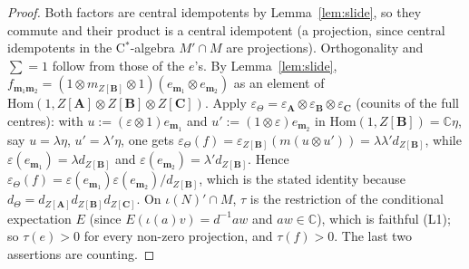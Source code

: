 \documentclass[11pt]{article}
\theoremstyle{definition}
\theoremstyle{remark}
\newcommand{\bfB}{\mathbf B}
\newcommand{\bfA}{\mathbf A}
\newcommand{\bfC}{\mathbf C}
\begin{document}
\begin{proof}
Both factors are central idempotents by Lemma~\ref{lem:slide}, so they commute and their product is a central idempotent (a projection, since central idempotents in the C$^*$-algebra $M'\cap M$ are projections). Orthogonality and $\sum=1$ follow from those of the $e$'s. By Lemma~\ref{lem:slide}, $f_{\mathbf m_1\mathbf m_2}=(1\otimes m_{Z[\bfB]}\otimes1)(e_{\mathbf m_1}\otimes e_{\mathbf m_2})$ as an element of $\mathrm{Hom}(1,Z[\bfA]\otimes Z[\bfB]\otimes Z[\bfC])$. Apply $\varepsilon_\Theta=\varepsilon_{\bfA}\otimes\varepsilon_{\bfB}\otimes\varepsilon_{\bfC}$ (counits of the full centres): with $u:=(\varepsilon\otimes1)e_{\mathbf m_1}$ and $u':=(1\otimes\varepsilon)e_{\mathbf m_2}$ in $\mathrm{Hom}(1,Z[\bfB])=\mathbb C\eta$, say $u=\lambda\eta$, $u'=\lambda'\eta$, one gets $\varepsilon_\Theta(f)=\varepsilon_{Z[\bfB]}(m(u\otimes u'))=\lambda\lambda'd_{Z[\bfB]}$, while $\varepsilon(e_{\mathbf m_1})=\lambda d_{Z[\bfB]}$ and $\varepsilon(e_{\mathbf m_2})=\lambda'd_{Z[\bfB]}$. Hence $\varepsilon_\Theta(f)=\varepsilon(e_{\mathbf m_1})\varepsilon(e_{\mathbf m_2})/d_{Z[\bfB]}$, which is the stated identity because $d_\Theta=d_{Z[\bfA]}d_{Z[\bfB]}d_{Z[\bfC]}$. On $\iota(N)'\cap M$, $\tau$ is the restriction of the conditional expectation $E$ (since $E(\iota(a)v)=d^{-1}aw$ and $aw\in\mathbb C$), which is faithful (L1); so $\tau(e)>0$ for every non-zero projection, and $\tau(f)>0$. The last two assertions are counting.
\end{proof}
\end{document}
